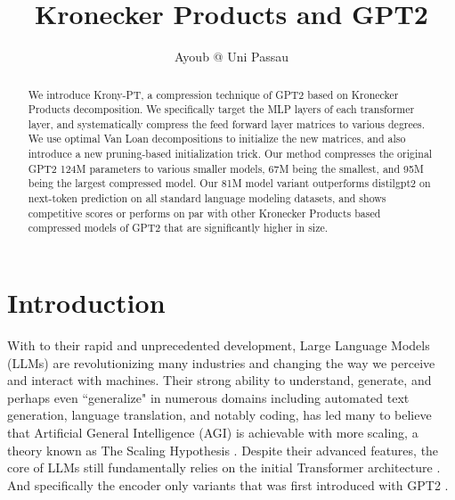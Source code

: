 \documentclass{article}
\title{Kronecker Products and GPT2}
\author{Ayoub @ Uni Passau}
\begin{document}
\maketitle

\begin{abstract}
	We introduce Krony-PT, a compression technique of GPT2 \cite{radford2019language} based on Kronecker Products decomposition. We specifically target the MLP layers of each transformer layer, and systematically compress the feed forward layer matrices to various degrees. We use optimal Van Loan decompositions to initialize the new matrices, and also introduce a new pruning-based initialization trick. Our method compresses the original GPT2 124M parameters to various smaller models, 67M being the smallest, and 95M being the largest compressed model. Our 81M model variant outperforms distilgpt2 on next-token prediction on all standard language modeling datasets, and shows competitive scores or performs on par with other Kronecker Products based compressed models of GPT2 that are significantly higher in size. 
\end{abstract}

\newpage

\tableofcontents
\newpage

\section{Introduction}
\label{sec:Introduction}

With to their rapid and unprecedented development, Large Language Models (LLMs) are revolutionizing many industries and changing the way we perceive and interact with machines. Their strong ability to understand, generate, and perhaps even ``generalize" in numerous domains including automated text generation, language translation, and notably coding, has led many to believe that Artificial General Intelligence (AGI) is achievable with more scaling, a theory known as The Scaling Hypothesis \cite{branwen2021scaling}. Despite their advanced features, the core of LLMs still fundamentally relies on the initial Transformer architecture \cite{vaswani2017attention}. And specifically the encoder only variants that was first introduced with GPT2 \cite{radford2019language}. 

\end{document}
